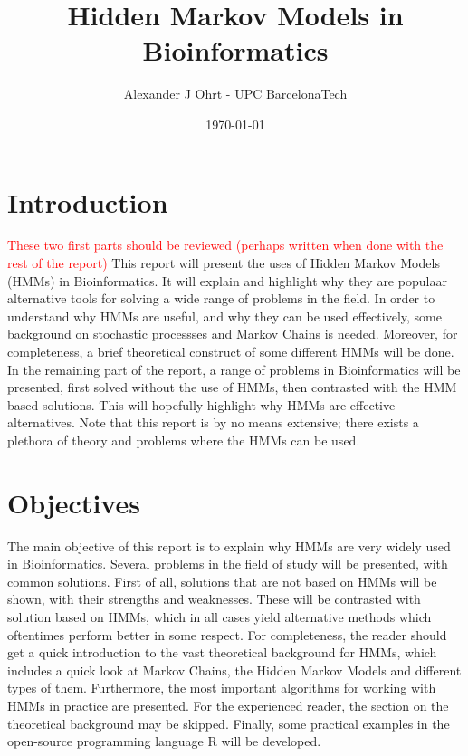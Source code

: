 \documentclass{article}
\title{Hidden Markov Models in Bioinformatics}
\author{Alexander J Ohrt - UPC BarcelonaTech}
\date{\today}
\begin{document}
\maketitle

\tableofcontents

\section{Introduction}
\textcolor{red}{These two first parts should be reviewed (perhaps written when done with the rest of the report)}
This report will present the uses of Hidden Markov Models (HMMs) in Bioinformatics. It will explain and highlight why they are populaar alternative tools for solving a wide range of problems in the field. In order to understand why HMMs are useful, and why they can be used effectively, some background on stochastic processses and Markov Chains is needed. Moreover, for completeness, a brief theoretical construct of some different HMMs will be done. In the remaining part of the report, a range of problems in Bioinformatics will be presented, first solved without the use of HMMs, then contrasted with the HMM based solutions. This will hopefully highlight why HMMs are effective alternatives. Note that this report is by no means extensive; there exists a plethora of theory and problems where the HMMs can be used. 

\section{Objectives}

The main objective of this report is to explain why HMMs are very widely used in Bioinformatics. Several problems in the field of study will be presented, with common solutions. First of all, solutions that are not based on HMMs will be shown, with their strengths and weaknesses. These will be contrasted with solution based on HMMs, which in all cases yield alternative methods which oftentimes perform better in some respect. For completeness, the reader should get a quick introduction to the vast theoretical background for HMMs, which includes a quick look at Markov Chains, the Hidden Markov Models and different types of them. Furthermore, the most important algorithms for working with HMMs in practice are presented. For the experienced reader, the section on the theoretical background may be skipped. Finally, some practical examples in the open-source programming language R will be developed. 
\end{document}
